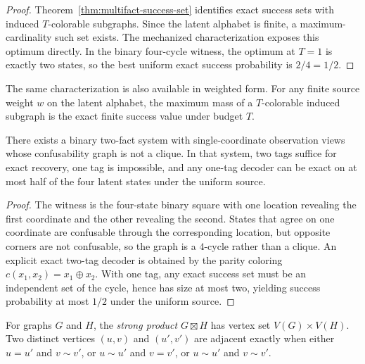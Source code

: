 \begin{proof}
Theorem~\ref{thm:multifact-success-set} identifies exact success sets with induced $T$-colorable subgraphs. Since the latent alphabet is finite, a maximum-cardinality such set exists. The mechanized characterization exposes this optimum directly. In the binary four-cycle witness, the optimum at $T=1$ is exactly two states, so the best uniform exact success probability is $2/4=1/2$.
\end{proof}

The same characterization is also available in weighted form. For any finite source weight $w$ on the latent alphabet, the maximum mass of a $T$-colorable induced subgraph is the exact finite success value under budget $T$.

\begin{theorem}\label{thm:multifact-nonclique}
There exists a binary two-fact system with single-coordinate observation views whose confusability graph is not a clique. In that system, two tags suffice for exact recovery, one tag is impossible, and any one-tag decoder can be exact on at most half of the four latent states under the uniform source.
\end{theorem}

\begin{proof}
The witness is the four-state binary square with one location revealing the first coordinate and the other revealing the second. States that agree on one coordinate are confusable through the corresponding location, but opposite corners are not confusable, so the graph is a $4$-cycle rather than a clique. An explicit exact two-tag decoder is obtained by the parity coloring $c(x_1,x_2)=x_1\oplus x_2$. With one tag, any exact success set must be an independent set of the cycle, hence has size at most two, yielding success probability at most $1/2$ under the uniform source.
\end{proof}

\begin{definition}\label{def:strong-product}
For graphs $G$ and $H$, the \emph{strong product} $G\boxtimes H$ has vertex set $V(G)\times V(H)$. Two distinct vertices $(u,v)$ and $(u',v')$ are adjacent exactly when either $u=u'$ and $v\sim v'$, or $u\sim u'$ and $v=v'$, or $u\sim u'$ and $v\sim v'$.
\end{definition}

